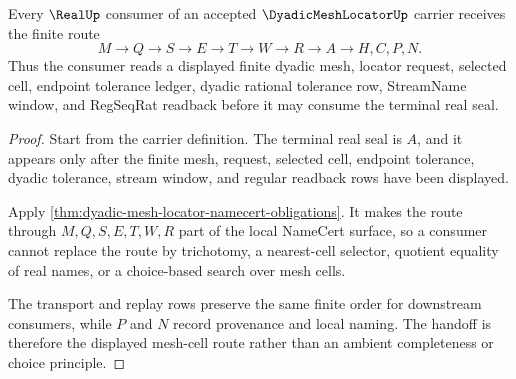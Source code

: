 \begin{theorem}
\label{thm:dyadic-mesh-locator-finite-cell-handoff}
Every $\RealUp$ consumer of an accepted $\DyadicMeshLocatorUp$ carrier receives the finite route
$$
M \longrightarrow Q \longrightarrow S \longrightarrow E \longrightarrow T \longrightarrow W \longrightarrow R \longrightarrow A \longrightarrow H,C,P,N .
$$
Thus the consumer reads a displayed finite dyadic mesh, locator request, selected cell, endpoint tolerance ledger, dyadic rational tolerance row, StreamName window, and RegSeqRat readback before it may consume the terminal real seal.
\end{theorem}
\begin{proof}
Start from the carrier definition. The terminal real seal is $A$, and it appears only after the finite mesh, request, selected cell, endpoint tolerance, dyadic tolerance, stream window, and regular readback rows have been displayed.

Apply \autoref{thm:dyadic-mesh-locator-namecert-obligations}. It makes the route through $M,Q,S,E,T,W,R$ part of the local NameCert surface, so a consumer cannot replace the route by trichotomy, a nearest-cell selector, quotient equality of real names, or a choice-based search over mesh cells.

The transport and replay rows preserve the same finite order for downstream consumers, while $P$ and $N$ record provenance and local naming. The handoff is therefore the displayed mesh-cell route rather than an ambient completeness or choice principle.
\end{proof}


\begin{closurestatus}{\DyadicMeshLocatorUp}
  \theoryclosure{\seedClosure}
  \formalstatus{\unformalizedV}
\end{closurestatus}
